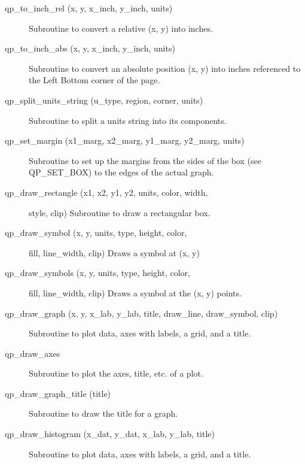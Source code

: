 \begin{description}
\item[qp\_to\_inch\_rel (x, y, x\_inch, y\_inch, units)] \Newline 
     Subroutine to convert a relative (x, y) into inches.

\item[qp\_to\_inch\_abs (x, y, x\_inch, y\_inch, units)] \Newline 
     Subroutine to convert an absolute position (x, y) into inches referenced
     to the Left Bottom corner of the page.

\item[qp\_split\_units\_string (u\_type, region, corner, units)] \Newline 
     Subroutine to split a units string into its components.

\item[qp\_set\_margin (x1\_marg, x2\_marg, y1\_marg, y2\_marg, units)] \Newline 
     Subroutine to set up the margins from the sides of the box (see QP\_SET\_BOX)
     to the edges of the actual graph.

\item[qp\_draw\_rectangle (x1, x2, y1, y2, units, color, width, ] \Newline 
                                                         style, clip)
     Subroutine to draw a rectangular box.

\item[qp\_draw\_symbol (x, y, units, type, height, color, ] \Newline 
                                                fill, line\_width, clip)
     Draws a symbol at (x, y) 

\item[qp\_draw\_symbols (x, y, units, type, height, color, ] \Newline 
                                                    fill, line\_width, clip)
     Draws a symbol at the (x, y) points. 

\item[qp\_draw\_graph (x, y, x\_lab, y\_lab, title, 
                                draw\_line, draw\_symbol, clip) ] \Newline 
     Subroutine to plot data, axes with labels, a grid, and a title.

\item[qp\_draw\_axes] \Newline 
     Subroutine to plot the axes, title, etc. of a plot.

\item[qp\_draw\_graph\_title (title)] \Newline 
     Subroutine to draw the title for a graph.

\item[qp\_draw\_histogram (x\_dat, y\_dat, x\_lab, y\_lab, title)] \Newline 
     Subroutine to plot data, axes with labels, a grid, and a title.


\end{description}
